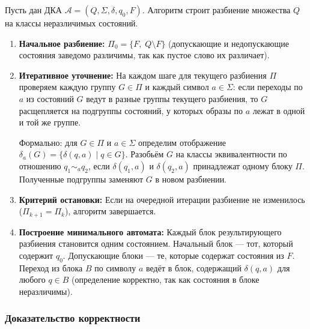 \documentclass[12pt,a4paper]{article}
\theoremstyle{definition}
\newcommand{\A}{\mathcal{A}}
\begin{document}
Пусть дан ДКА $\A = (Q, \Sigma, \delta, q_0, F)$. Алгоритм строит разбиение множества $Q$ на классы неразличимых состояний.

\begin{enumerate}
\item \textbf{Начальное разбиение:} $\Pi_0 = \{F,\; Q\setminus F\}$ (допускающие и недопускающие состояния заведомо различимы, так как пустое слово их различает).

\item \textbf{Итеративное уточнение:} На каждом шаге для текущего разбиения $\Pi$ проверяем каждую группу $G\in\Pi$ и каждый символ $a\in\Sigma$: если переходы по $a$ из состояний $G$ ведут в разные группы текущего разбиения, то $G$ расщепляется на подгруппы состояний, у которых образы по $a$ лежат в одной и той же группе.

Формально: для $G\in\Pi$ и $a\in\Sigma$ определим отображение $\delta_a(G) = \{\delta(q,a) \mid q\in G\}$. Разобьём $G$ на классы эквивалентности по отношению $q_1 \sim_a q_2$, если $\delta(q_1,a)$ и $\delta(q_2,a)$ принадлежат одному блоку $\Pi$. Полученные подгруппы заменяют $G$ в новом разбиении.

\item \textbf{Критерий остановки:} Если на очередной итерации разбиение не изменилось ($\Pi_{k+1} = \Pi_k$), алгоритм завершается.

\item \textbf{Построение минимального автомата:} Каждый блок результирующего разбиения становится одним состоянием. Начальный блок — тот, который содержит $q_0$. Допускающие блоки — те, которые содержат состояния из $F$. Переход из блока $B$ по символу $a$ ведёт в блок, содержащий $\delta(q,a)$ для любого $q\in B$ (определение корректно, так как состояния в блоке неразличимы).
\end{enumerate}

\subsubsection{Доказательство корректности}
\end{document}
